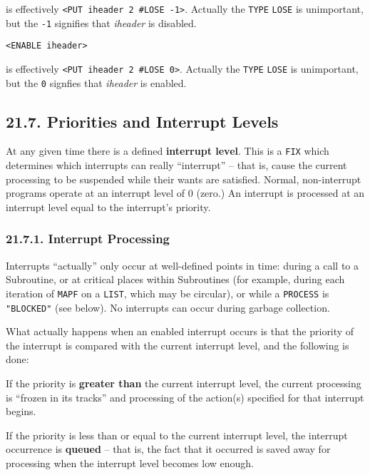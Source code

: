 \documentclass[a4paper,]{article}
\begin{document}
 is effectively \texttt{\textless{}PUT\ iheader\ 2\ \#LOSE\ -1\textgreater{}}. Actually the
\texttt{TYPE} \texttt{LOSE} is unimportant, but the \texttt{-1} signifies that \emph{iheader} is disabled.

\begin{verbatim}
<ENABLE iheader>
\end{verbatim}

 is effectively \texttt{\textless{}PUT\ iheader\ 2\ \#LOSE\ 0\textgreater{}}. Actually the
\texttt{TYPE} \texttt{LOSE} is unimportant, but the \texttt{0} signfies that \emph{iheader} is enabled.

\subsection{21.7. Priorities and Interrupt Levels}\label{priorities-and-interrupt-levels}

At any given time there is a defined \textbf{interrupt level}. This is a \texttt{FIX} which determines which interrupts can
really ``interrupt'' -- that is, cause the current processing to be suspended while their wants are satisfied. Normal,
non-interrupt programs operate at an interrupt level of 0 (zero.) An interrupt is processed at an interrupt level equal to
the interrupt's priority.

\subsubsection{21.7.1. Interrupt Processing}\label{interrupt-processing}

Interrupts ``actually'' only occur at well-defined points in time: during a call to a Subroutine, or at critical places
within Subroutines (for example, during each iteration of \texttt{MAPF} on a \texttt{LIST}, which may be circular), or
while a \texttt{PROCESS} is \texttt{"BLOCKED"}  (see below). No interrupts can occur during
garbage collection.

What actually happens when an enabled interrupt occurs is that the priority of the interrupt is compared with the current
interrupt level, and the following is done:

If the priority is \textbf{greater than} the current interrupt level, the current processing is ``frozen in its tracks''
and processing of the action(s) specified for that interrupt begins.

If the priority is less than or equal to the current interrupt level, the interrupt occurrence is \textbf{queued} -- that
is, the fact that it occurred is saved away for processing when the interrupt level becomes low enough.
\end{document}
